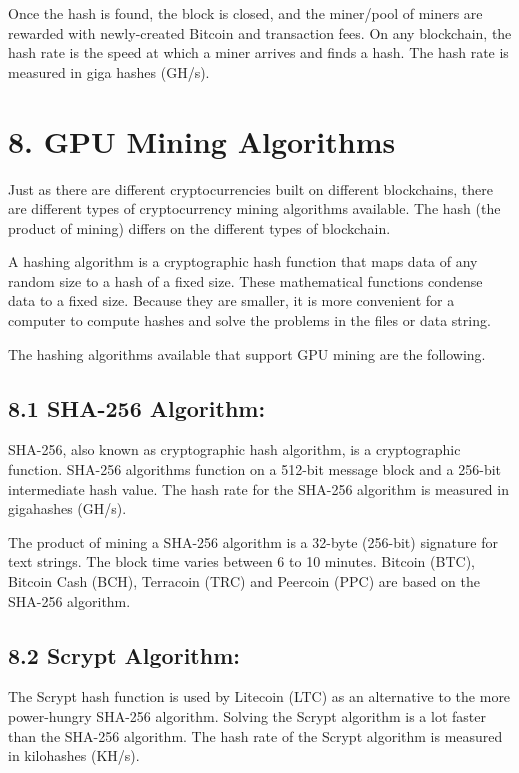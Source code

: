 Once the hash is found, the block is closed, and the miner/pool of miners are rewarded with newly-created Bitcoin and transaction fees. On any blockchain, the hash rate is the speed at which a miner arrives and finds a hash. The hash rate is measured in giga hashes (GH/s).\vspace{.3 cm}

\section*{8. GPU Mining Algorithms}
Just as there are different cryptocurrencies built on different blockchains, there are different types of cryptocurrency mining algorithms available. The hash (the product of mining) differs on the different types of blockchain.\vspace{.3 cm}

A hashing algorithm is a cryptographic hash function that maps data of any random size to a hash of a fixed size. These mathematical functions condense data to a fixed size. Because they are smaller, it is more convenient for a computer to compute hashes and solve the problems in the files or data string.\vspace{.3 cm}

The hashing algorithms available that support GPU mining are the following.\vspace{.3 cm}

\subsection*{8.1 SHA-256 Algorithm:}
SHA-256, also known as cryptographic hash algorithm, is a cryptographic function. SHA-256 algorithms function on a 512-bit message block and a 256-bit intermediate hash value. The hash rate for the SHA-256 algorithm is measured in gigahashes (GH/s).\vspace{.3 cm}

The product of mining a SHA-256 algorithm is a 32-byte (256-bit) signature for text strings. The block time varies between 6 to 10 minutes. Bitcoin (BTC), Bitcoin Cash (BCH), Terracoin (TRC) and Peercoin (PPC) are based on the SHA-256 algorithm.\vspace{.3 cm}

\subsection*{8.2 Scrypt Algorithm:}
The Scrypt hash function is used by Litecoin (LTC) as an alternative to the more power-hungry SHA-256 algorithm. Solving the Scrypt algorithm is a lot faster than the SHA-256 algorithm. The hash rate of the Scrypt algorithm is measured in kilohashes (KH/s).\vspace{.3 cm}

